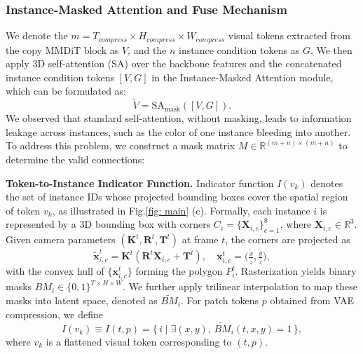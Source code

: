 \documentclass{article} %
\begin{document}
\subsubsection{Instance-Masked Attention and Fuse Mechanism}
We denote the $m = T_{compress} \times H_{compress} \times W_{compress}$ visual tokens extracted from the copy MMDiT block as $V$, and the $n$ instance condition tokens as $G$. We then apply 3D self-attention (SA) over the backbone features and the concatenated instance condition tokens $[V, G]$ in the Instance-Masked Attention module, 
which can be formulated as:
\begin{equation}
    \tilde{V} = \text{SA}_\text{mask}([V, G]).
\end{equation}  
We observed that standard self-attention, without masking, leads to information leakage across instances, such as the color of one instance bleeding into another. 
To address this problem, 
we construct a mask matrix
$M \in \mathbb{R}^{(m+n)\times(m+n)}$ to determine the valid connections:


\noindent\textbf{Token-to-Instance Indicator Function.}  
Indicator function $I(v_k)$ denotes the set of instance IDs whose projected bounding boxes cover the spatial region of token $v_k$, as illustrated in Fig.\ref{fig: main} (c). 
Formally, each instance $i$ is represented by a 3D bounding box with corners $C_i = \{\mathbf{X}_{i,c}\}_{c=1}^{8}$, where $\mathbf{X}_{i,c} \in \mathbb{R}^3$. 
Given camera parameters $(\mathbf{K}^t,\mathbf{R}^t,\mathbf{T}^t)$ at frame $t$, the corners are projected as
\begin{equation}
\tilde{\mathbf{x}}_{i,c}^t = \mathbf{K}^t \left( \mathbf{R}^t \mathbf{X}_{i,c} + \mathbf{T}^t \right), 
\quad
\mathbf{x}_{i,c}^t = \Big(\tfrac{\tilde{x}}{\tilde{z}}, \tfrac{\tilde{y}}{\tilde{z}}\Big),
\end{equation}
with the convex hull of $\{\mathbf{x}_{i,c}^t\}$ forming the polygon $P_i^t$.  
Rasterization yields binary masks $BM_i \in \{0,1\}^{T \times H \times W}$. 
We further apply trilinear interpolation to map these masks into latent space, denoted as $\tilde{BM}_i$.
For patch tokens $p$ obtained from VAE compression,%
we define
\begin{equation}
I(v_k) \equiv I(t,p) = \{\, i \mid \exists (x,y),\, \tilde{BM}_i(t,x,y)=1 \,\}, 
\end{equation}
where $v_k$ is a flattened visual token corresponding to $(t,p)$.
\end{document}
